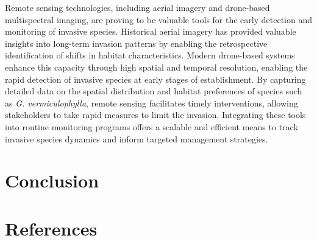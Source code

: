 \documentclass[
  letterpaper,
  DIV=11,
  numbers=noendperiod]{scrartcl}
\begin{document}
Remote sensing technologies, including aerial imagery and drone-based
multispectral imaging, are proving to be valuable tools for the early
detection and monitoring of invasive species. Historical aerial imagery
has provided valuable insights into long-term invasion patterns by
enabling the retrospective identification of shifts in habitat
characteristics. Modern drone-based systems enhance this capacity
through high spatial and temporal resolution, enabling the rapid
detection of invasive species at early stages of establishment. By
capturing detailed data on the spatial distribution and habitat
preferences of species such as \emph{G. vermiculophylla}, remote sensing
facilitates timely interventions, allowing stakeholders to take rapid
measures to limit the invasion. Integrating these tools into routine
monitoring programs offers a scalable and efficient means to track
invasive species dynamics and inform targeted management strategies.

\section{Conclusion}\label{conclusion}

\section*{References}\label{references}
\end{document}

